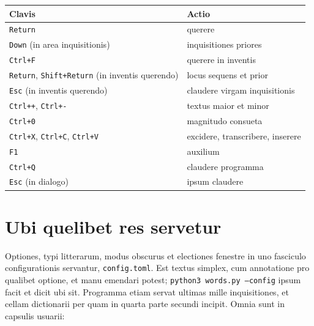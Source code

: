 \documentclass[12pt,
              article,
              oneside
              ]{memoir}
\newcommand*{\key}[1]{\texttt{#1}}
\begin{document}
%
\begin{longtable}{@{}>{\raggedright}p{}p{}@{}}
\toprule
Clavis & Actio\\
\midrule
\endhead
\key{Return} & querere\\
\key{Down} (in area inquisitionis) & inquisitiones priores\\
\key{Ctrl+F} & querere in inventis\\
\key{Return}, \key{Shift+Return} (in inventis querendo) & locus sequens et prior\\
\key{Esc} (in inventis querendo) & claudere virgam inquisitionis\\
\key{Ctrl++}, \key{Ctrl+-} & textus maior et minor\\
\key{Ctrl+0} & magnitudo consueta\\
\key{Ctrl+X}, \key{Ctrl+C}, \key{Ctrl+V} & excidere, transcribere, inserere\\
\key{F1} & auxilium\\
\key{Ctrl+Q} & claudere programma\\
\key{Esc} (in dialogo) & ipsum claudere\\
\bottomrule
\end{longtable}

\section{Ubi quelibet res servetur}
\label{sec:files}

%
Optiones, typi litterarum, modus obscurus et electiones fenestre in uno
fasciculo configurationis servantur, \texttt{config.toml}. Est textus
simplex, cum annotatione pro qualibet optione, et manu emendari potest;
\texttt{python3 words.py --config} ipsum facit et dicit ubi sit.
Programma etiam servat ultimas mille inquisitiones, et cellam dictionarii
per quam in quarta parte secundi incipit. Omnia sunt in capsulis
usuarii:
\end{document}

